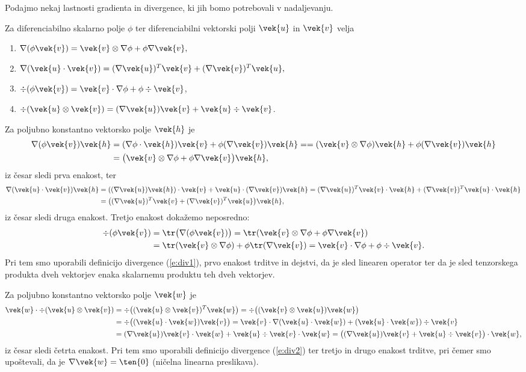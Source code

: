 Podajmo nekaj lastnosti gradienta in divergence, ki jih bomo potrebovali v nadaljevanju.
\begin{trditev} \label{t:divprop}
	Za diferenciabilno skalarno polje $\phi$ ter diferenciabilni vektorski polji $\vek{u}$ in $\vek{v}$ velja
	\begin{enumerate}
		\item $\nabla(\phi\vek{v})=\vek{v}\otimes\nabla\phi+\phi\nabla\vek{v},$
		\item $\nabla(\vek{u}\cdot\vek{v})=(\nabla\vek{u})^T\vek{v}+(\nabla\vek{v})^T\vek{u},$
		\item $\div(\phi\vek{v})=\vek{v}\cdot\nabla\phi+\phi\div\vek{v}$,
		\item $\div(\vek{u}\otimes\vek{v})=(\nabla\vek{u})\vek{v}+\vek{u}\div\vek{v}$.
	\end{enumerate}
\end{trditev}
\proof
	Za poljubno konstantno vektorsko polje $\vek{h}$ je
	\begin{align*}
		\nabla(\phi\vek{v})\vek{h}&=
		(\nabla\phi\cdot\vek{h})\vek{v}+\phi(\nabla\vek{v})\vek{h}=
		=(\vek{v}\otimes\nabla\phi)\vek{h}+\phi(\nabla\vek{v})\vek{h}\\
		&=\big(\vek{v}\otimes\nabla\phi+\phi\nabla\vek{v}\big)\vek{h},
	\end{align*}
	iz česar sledi prva enakost, ter
	\begin{align*}
		\nabla(\vek{u}\cdot\vek{v})\vek{h}&=((\nabla\vek{u})\vek{h})\cdot\vek{v}+\vek{u}\cdot(\nabla\vek{v})\vek{h}=
		(\nabla\vek{u})^T\vek{v}\cdot\vek{h}+(\nabla\vek{v})^T\vek{u}\cdot\vek{h}\\
		&=\big((\nabla\vek{u})^T\vek{v}+(\nabla\vek{v})^T\vek{u}\big)\vek{h},
	\end{align*}
	iz česar sledi druga enakost. Tretjo enakost dokažemo neposredno:
	\begin{align*}
		\div(\phi\vek{v})&=\tr\big(\nabla(\phi\vek{v})\big)=\tr(\vek{v}\otimes\nabla\phi+\phi\nabla\vek{v})\\
		&=\tr(\vek{v}\otimes\nabla\phi)+\phi\tr(\nabla\vek{v})=\vek{v}\cdot\nabla\phi+\phi\div\vek{v}.
	\end{align*}
	Pri tem smo uporabili definicijo divergence (\ref{e:div1}), prvo enakost trditve in dejstvi, da je sled
	linearen operator ter da je sled tenzorskega produkta dveh vektorjev enaka skalarnemu produktu teh
	dveh vektorjev.
	
	Za poljubno konstantno vektorsko polje $\vek{w}$ je
	\begin{align*}
		\vek{w}\cdot\div(\vek{u}\otimes\vek{v})&=\div\big((\vek{u}\otimes\vek{v})^T\vek{w}\big)=
		\div\big((\vek{v}\otimes\vek{u})\vek{w}\big)\\
		&=\div\big((\vek{u}\cdot\vek{w})\vek{v}\big)=\vek{v}\cdot\nabla(\vek{u}\cdot\vek{w})+(\vek{u}\cdot\vek{w})\div\vek{v}\\
		&=(\nabla\vek{u})\vek{v}\cdot\vek{w}+\vek{u}\div\vek{v}\cdot\vek{w}=\big((\nabla\vek{u})\vek{v}+\vek{u}\div\vek{v}\big)\cdot\vek{w},
	\end{align*}
	iz česar sledi četrta enakost. Pri tem smo uporabili definicijo divergence (\ref{e:div2}) ter
	tretjo in drugo enakost trditve, pri čemer smo upoštevali, da je $\nabla\vek{w}=\ten{0}$
	(ničelna linearna preslikava).
\endproof



